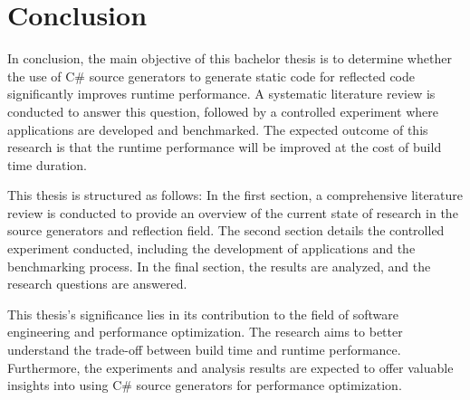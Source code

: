 \chapter{Conclusion}

In conclusion, the main objective of this bachelor thesis is to determine whether the use of C\# source generators to generate static code for reflected code significantly improves runtime performance. A systematic literature review is conducted to answer this question, followed by a controlled experiment where applications are developed and benchmarked. The expected outcome of this research is that the runtime performance will be improved at the cost of build time duration.

This thesis is structured as follows: In the first section, a comprehensive literature review is conducted to provide an overview of the current state of research in the source generators and reflection field. The second section details the controlled experiment conducted, including the development of applications and the benchmarking process. In the final section, the results are analyzed, and the research questions are answered.

This thesis's significance lies in its contribution to the field of software engineering and performance optimization. The research aims to better understand the trade-off between build time and runtime performance. Furthermore, the experiments and analysis results are expected to offer valuable insights into using C\# source generators for performance optimization.
